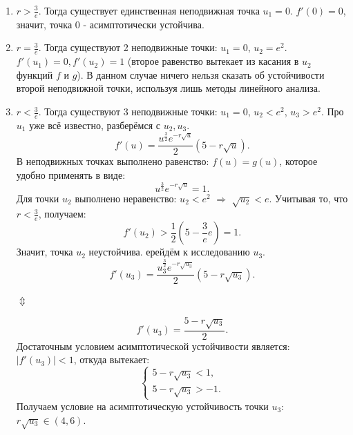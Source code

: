 \documentclass[12pt]{article}
\begin{document}
\begin{enumerate}
    \item $r > \frac{3}{e}$. Тогда существует единственная неподвижная точка $u_1 = 0$. $f'(0) = 0$, значит, точка 0 - асимптотически устойчива.
    \item $r = \frac{3}{e}.$ Тогда существуют 2 неподвижные точки: $u_1 = 0$, $u_2 = e^2$. $f'(u_1) = 0, f'(u_2) = 1$ (второе равенство вытекает из касания в $u_2$ функций $f$ и $g$). В данном случае ничего нельзя сказать об устойчивости второй неподвижной точки, используя лишь методы линейного анализа.
    \item $r < \frac{3}{e}$. Тогда существуют 3 неподвижные точки: $u_1 = 0$, $u_2 < e^2$, $u_3 > e^2$. Про $u_1$ уже всё известно, разберёмся с $u_2, u_3$.
    \begin{equation}
        f'(u) = \frac{u^\frac{3}{2}e^{-r\sqrt{u}}}{2}(5 - r\sqrt{u}).
    \end{equation}
    В неподвижных точках выполнено равенство: $f(u) = g(u)$, которое удобно применять в виде:
    \begin{equation}
        u^\frac{3}{2}e^{-r\sqrt{u}} = 1.
    \end{equation}
    Для точки $u_2$ выполнено неравенство: $u_2 < e^2$ $\Rightarrow$ $\sqrt{u_2} < e$. Учитывая то, что $r < \frac{3}{e}$, получаем:
    \begin{equation}
        f'(u_2) > \frac{1}{2}(5 - \frac{3}{e}e) = 1.
    \end{equation}
    Значит, точка $u_2$ неустойчива. ерейдём к исследованию $u_3$.
    \begin{equation}
        f'(u_3) = \frac{u_3^\frac{3}{2}e^{-r\sqrt{u_3}}}{2}(5 - r\sqrt{u_3}).
    \end{equation}
    \begin{center}
        $\Updownarrow$
    \end{center}
    \begin{equation}
        f'(u_3) = \frac{5 - r\sqrt{u_3}}{2}.
    \end{equation}
    Достаточным условием асимптотической устойчивости является: $|f'(u_3)| < 1$, откуда вытекает:
    \begin{equation}
        \begin{cases}
            5 - r\sqrt{u_3} < 1,\\
            5 - r\sqrt{u_3} > -1.
        \end{cases}
    \end{equation}
    Получаем условие на асимптотическую устойчивость точки $u_3$: $r\sqrt{u_3} \in (4, 6)$.

\end{enumerate}
\end{document}
